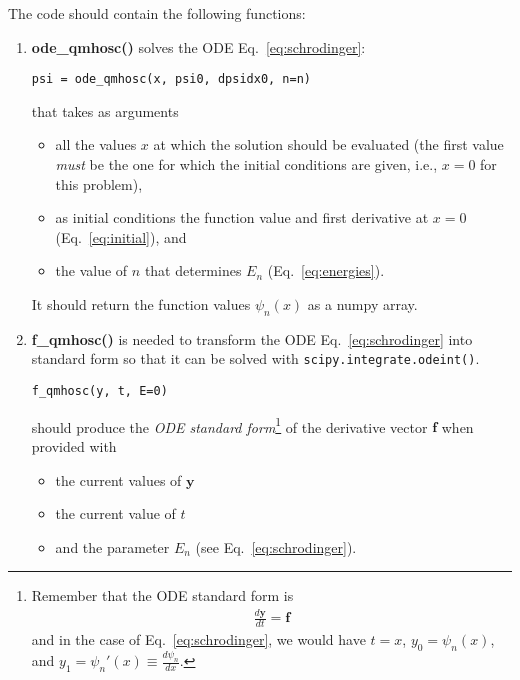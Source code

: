 \documentclass[letterpaper]{scrartcl}
\renewcommand{\vec}[1]{\ensuremath{\mathbf{#1}}}
\begin{document}
The code should contain the following functions:
\begin{enumerate}
\item \textbf{ode\_qmhosc()} solves the ODE Eq.~\ref{eq:schrodinger}:
\begin{lstlisting}
psi = ode_qmhosc(x, psi0, dpsidx0, n=n)
\end{lstlisting}
  that takes as arguments
  \begin{itemize}
  \item all the values $x$ at which the solution should be evaluated
    (the first value \emph{must} be the one for which the initial
    conditions are given, i.e., $x=0$ for this problem),
  \item as initial conditions the function value and first derivative
    at $x=0$ (Eq.~\ref{eq:initial}), and
  \item the value of $n$ that determines $E_{n}$
    (Eq.~\ref{eq:energies}).
  \end{itemize}
  It should return the function values $\psi_{n}(x)$ as a numpy array.
\item \textbf{f\_qmhosc()} is needed to transform the ODE
  Eq.~\ref{eq:schrodinger} into standard form so that it can be solved
  with \texttt{scipy.integrate.odeint()}.
\begin{lstlisting}
f_qmhosc(y, t, E=0)
\end{lstlisting}
  should produce the \emph{ODE standard form}\footnote{Remember that
    the ODE standard form is
    \begin{gather*}
      \frac{d\vec{y}}{dt} = \vec{f}
    \end{gather*}
    and in the case of Eq.~\ref{eq:schrodinger}, we would have
    $t = x$, $y_{0} = \psi_{n}(x)$, and
    $y_{1} = \psi_{n}'(x) \equiv \frac{d\psi_{n}}{dx}$.} of the derivative
  vector $\vec{f}$ when provided with
  \begin{itemize}
  \item the current values of $\vec{y}$
  \item the current value of $t$
  \item and the parameter $E_{n}$ (see Eq.~\ref{eq:schrodinger}).
  \end{itemize}
\end{enumerate}
\end{document}
